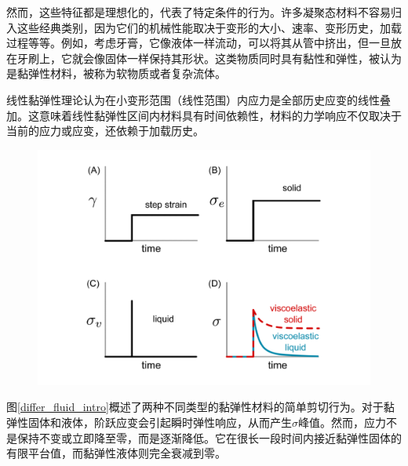 然而，这些特征都是理想化的，代表了特定条件的行为。许多凝聚态材料不容易归入这些经典类别，因为它们的机械性能取决于变形的大小、速率、变形历史，加载过程等等。例如，考虑牙膏，它像液体一样流动，可以将其从管中挤出，但一旦放在牙刷上，它就会像固体一样保持其形状。这类物质同时具有黏性和弹性，被认为是黏弹性材料，被称为软物质或者复杂流体\cite{songNonMaxwellianViscoelasticStress2023}。

线性黏弹性理论认为在小变形范围（线性范围）内应力是全部历史应变的线性叠加。这意味着线性黏弹性区间内材料具有时间依赖性，材料的力学响应不仅取决于当前的应力或应变，还依赖于加载历史。
\begin{figure}[htbp]
  \centering
  \includegraphics[width=\textwidth]{Fig/solid_liquid.pdf}
\end{figure}
图\ref{differ_fluid_intro}概述了两种不同类型的黏弹性材料的简单剪切行为。对于黏弹性固体和液体，阶跃应变会引起瞬时弹性响应，从而产生$\sigma$峰值。然而，应力不是保持不变或立即降至零，而是逐渐降低。它在很长一段时间内接近黏弹性固体的有限平台值，而黏弹性液体则完全衰减到零\cite{ricarteTutorialReviewLinear2024}。

